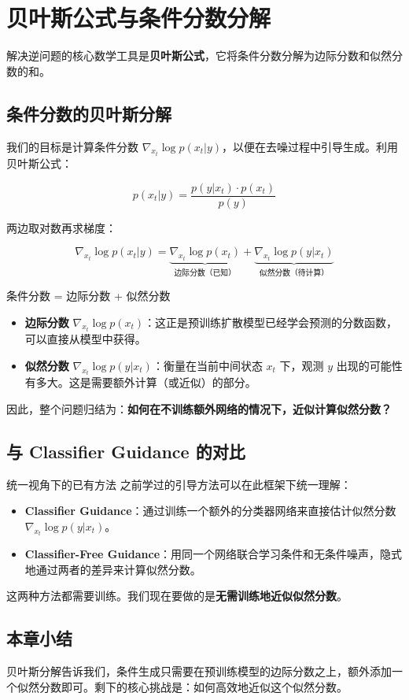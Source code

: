 \section{贝叶斯公式与条件分数分解}

解决逆问题的核心数学工具是\textbf{贝叶斯公式}，它将条件分数分解为边际分数和似然分数的和。

\subsection{条件分数的贝叶斯分解}

我们的目标是计算条件分数 $\nabla_{x_t} \log p(x_t | y)$，以便在去噪过程中引导生成。利用贝叶斯公式：

$$
p(x_t | y) = \frac{p(y | x_t) \cdot p(x_t)}{p(y)}
$$

两边取对数再求梯度：

$$
\nabla_{x_t} \log p(x_t | y) = \underbrace{\nabla_{x_t} \log p(x_t)}_{\text{边际分数（已知）}} + \underbrace{\nabla_{x_t} \log p(y | x_t)}_{\text{似然分数（待计算）}}
$$

\begin{importantbox}{条件分数 = 边际分数 + 似然分数}
\begin{itemize}
    \item \textbf{边际分数} $\nabla_{x_t} \log p(x_t)$：这正是预训练扩散模型已经学会预测的分数函数，可以直接从模型中获得。
    \item \textbf{似然分数} $\nabla_{x_t} \log p(y | x_t)$：衡量在当前中间状态 $x_t$ 下，观测 $y$ 出现的可能性有多大。这是需要额外计算（或近似）的部分。
\end{itemize}
因此，整个问题归结为：\textbf{如何在不训练额外网络的情况下，近似计算似然分数？}
\end{importantbox}

\subsection{与 Classifier Guidance 的对比}

\begin{knowledgebox}{统一视角下的已有方法}
之前学过的引导方法可以在此框架下统一理解：
\begin{itemize}
    \item \textbf{Classifier Guidance}：通过训练一个额外的分类器网络来直接估计似然分数 $\nabla_{x_t} \log p(y | x_t)$。
    \item \textbf{Classifier-Free Guidance}：用同一个网络联合学习条件和无条件噪声，隐式地通过两者的差异来计算似然分数。
\end{itemize}
这两种方法都需要训练。我们现在要做的是\textbf{无需训练地近似似然分数}。
\end{knowledgebox}

\subsection{本章小结}

贝叶斯分解告诉我们，条件生成只需要在预训练模型的边际分数之上，额外添加一个似然分数即可。剩下的核心挑战是：如何高效地近似这个似然分数。


